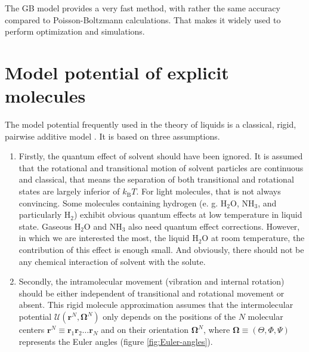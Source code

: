 The GB model provides a very fast method, with rather the same accuracy
compared to Poisson-Boltzmann calculations. That makes it widely used
to perform optimization and simulations.


\section{Model potential of explicit molecules}

The model potential frequently used in the theory of liquids is a
classical, rigid, pairwise additive model \citep{Hensen-McDonald,Gray-Gubbins}.
It is based on three assumptions. 
\begin{enumerate}
\item Firstly, the quantum effect of solvent should have been ignored. It
is assumed that the rotational and transitional motion of solvent
particles are continuous and classical, that means the separation
of both transitional and rotational states are largely inferior of
$k_{\mathrm{B}}T$. For light molecules, that is not always convincing.
Some molecules containing hydrogen (e. g. $\mathrm{H_{2}O}$, $\mathrm{NH_{3}}$,
and particularly $\mathrm{H_{2}}$) exhibit obvious quantum effects
at low temperature in liquid state. Gaseous $\mathrm{H_{2}O}$ and
$\mathrm{NH_{3}}$ also need quantum effect corrections. However,
in which we are interested the most, the liquid $\mathrm{H_{2}O}$
at room temperature, the contribution of this effect is enough small.
And obviously, there should not be any chemical interaction of solvent
with the solute.
\item Secondly, the intramolecular movement (vibration and internal rotation) should
be either independent of transitional and rotational movement or absent.
This rigid molecule approximation assumes that the intermolecular
potential $\mathcal{U}(\mathbf{r}^{N},\mathbf{\Omega}^{N})$ only
depends on the positions of the $N$ molecular centers $\mathbf{r}^{N}\equiv\mathbf{r}_{1}\mathbf{r}_{2}\ldots\mathbf{r}_{N}$
and on their orientation $\mathbf{\Omega}^{N}$, where $\mathbf{\Omega}\equiv(\Theta,\Phi,\Psi)$
represents the Euler angles (figure \ref{fig:Euler-angles}).



\end{enumerate}
